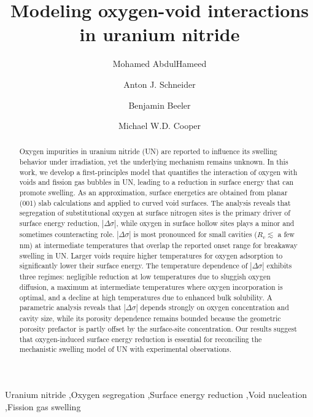 \documentclass[preprint,12pt,sort&compress]{elsarticle}
\newcommand{\?}{\stackrel{?}{=}}
\begin{document}
\begin{frontmatter}

\title{Modeling oxygen-void interactions in uranium nitride}

\author[ncsu]{Mohamed AbdulHameed}
\author[lanl]{Anton J. Schneider}
\author[ncsu,inl]{Benjamin Beeler}
\author[lanl]{Michael W.D. Cooper}

\address[ncsu]{Department of Nuclear Engineering, North Carolina State University, Raleigh, NC 27695}
\address[lanl]{Los Alamos National Laboratory, Los Alamos, NM 87545}
\address[inl]{Idaho National Laboratory, Idaho Falls, ID 83415}

\begin{abstract}

Oxygen impurities in uranium nitride (UN) are reported to influence its swelling behavior under irradiation, yet the underlying mechanism remains unknown. In this work, we develop a first-principles model that quantifies the interaction of oxygen with voids and fission gas bubbles in UN, leading to a reduction in surface energy that can promote swelling. As an approximation, surface energetics are obtained from planar (001) slab calculations and applied to curved void surfaces. The analysis reveals that segregation of substitutional oxygen at surface nitrogen sites is the primary driver of surface energy reduction, $|\Delta \sigma|$, while oxygen in surface hollow sites plays a minor and sometimes counteracting role. $|\Delta \sigma|$ is most pronounced for small cavities ($R_v \lesssim$ a few nm) at intermediate temperatures that overlap the reported onset range for breakaway swelling in UN. Larger voids require higher temperatures for oxygen adsorption to significantly lower their surface energy. The temperature dependence of $|\Delta \sigma|$ exhibits three regimes: negligible reduction at low temperatures due to sluggish oxygen diffusion, a maximum at intermediate temperatures where oxygen incorporation is optimal, and a decline at high temperatures due to enhanced bulk solubility. A parametric analysis reveals that $|\Delta \sigma|$ depends strongly on oxygen concentration and cavity size, while its porosity dependence remains bounded because the geometric porosity prefactor is partly offset by the surface-site concentration. Our results suggest that oxygen-induced surface energy reduction is essential for reconciling the mechanistic swelling model of UN with experimental observations.

\end{abstract}

\begin{keyword}
Uranium nitride \sep Oxygen segregation \sep Surface energy reduction \sep Void nucleation \sep Fission gas swelling
\end{keyword}

\end{frontmatter}
\end{document}
